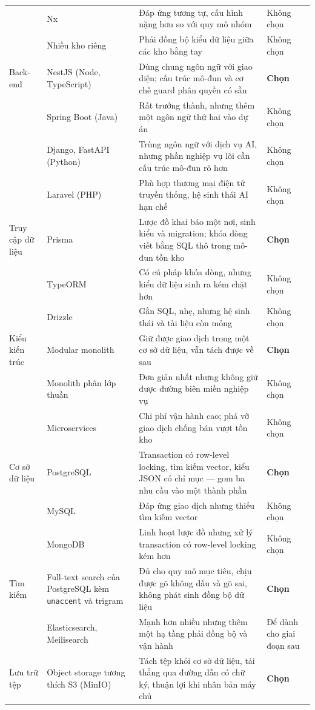 \begin{longtable}{L{2.60cm} L{3.53cm} L{4.36cm} L{4.05cm}}
& Nx & Đáp ứng tương tự, cấu hình nặng hơn so với quy mô nhóm & Không chọn \\
& Nhiều kho riêng & Phải đồng bộ kiểu dữ liệu giữa các kho bằng tay & Không chọn \\
Back-end & NestJS (Node, TypeScript) & Dùng chung ngôn ngữ với giao diện; cấu trúc mô-đun và cơ chế guard phân quyền có sẵn & \textbf{Chọn} \\
& Spring Boot (Java) & Rất trưởng thành, nhưng thêm một ngôn ngữ thứ hai vào dự án & Không chọn \\
& Django, FastAPI (Python) & Trùng ngôn ngữ với dịch vụ AI, nhưng phần nghiệp vụ lõi cần cấu trúc mô-đun rõ hơn & Không chọn \\
& Laravel (PHP) & Phù hợp thương mại điện tử truyền thống, hệ sinh thái AI hạn chế & Không chọn \\
Truy cập dữ liệu & Prisma & Lược đồ khai báo một nơi, sinh kiểu và migration; khóa dòng viết bằng SQL thô trong mô-đun tồn kho & \textbf{Chọn} \\
& TypeORM & Có cú pháp khóa dòng, nhưng kiểu dữ liệu sinh ra kém chặt hơn & Không chọn \\
& Drizzle & Gần SQL, nhẹ, nhưng hệ sinh thái và tài liệu còn mỏng & Không chọn \\
Kiểu kiến trúc & Modular monolith & Giữ được giao dịch trong một cơ sở dữ liệu, vẫn tách được về sau & \textbf{Chọn} \\
& Monolith phân lớp thuần & Đơn giản nhất nhưng không giữ được đường biên miền nghiệp vụ & Không chọn \\
& Microservices & Chi phí vận hành cao; phá vỡ giao dịch chống bán vượt tồn kho & Không chọn \\
Cơ sở dữ liệu & PostgreSQL & Transaction có row-level locking, tìm kiếm vector, kiểu JSON có chỉ mục --- gom ba nhu cầu vào một thành phần & \textbf{Chọn} \\
& MySQL & Đáp ứng giao dịch nhưng thiếu tìm kiếm vector & Không chọn \\
& MongoDB & Linh hoạt lược đồ nhưng xử lý transaction có row-level locking kém hơn & Không chọn \\
Tìm kiếm & Full-text search của PostgreSQL kèm \texttt{unaccent} và trigram & Đủ cho quy mô mục tiêu, chịu được gõ không dấu và gõ sai, không phát sinh đồng bộ dữ liệu & \textbf{Chọn} \\
& Elasticsearch, Meilisearch & Mạnh hơn nhiều nhưng thêm một hạ tầng phải đồng bộ và vận hành & Để dành cho giai đoạn sau \\
Lưu trữ tệp & Object storage tương thích S3 (MinIO) & Tách tệp khỏi cơ sở dữ liệu, tải thẳng qua đường dẫn có chữ ký, thuận lợi khi nhân bản máy chủ & \textbf{Chọn} \\

\end{longtable}
